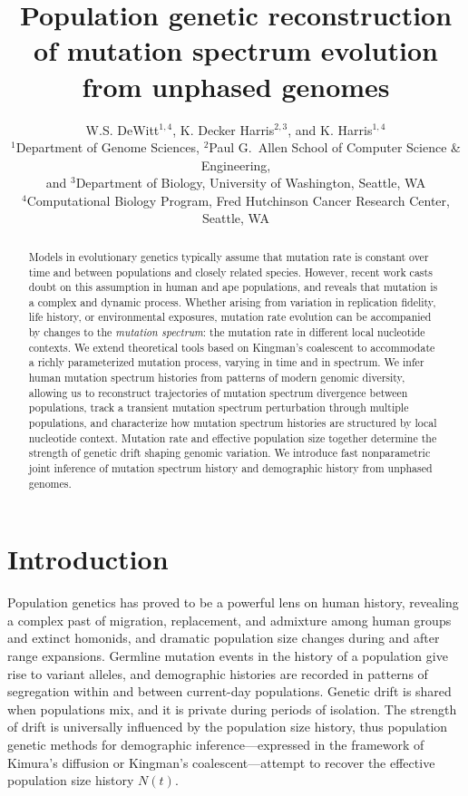 \documentclass[11pt]{article}
\title{Population genetic reconstruction of mutation spectrum evolution from unphased genomes}
\author{
W.S. DeWitt$^{1,4}$, K. Decker Harris$^{2,3}$, and K. Harris$^{1,4}$\\
{\small
$^1$Department of Genome Sciences,
$^2$Paul G.\ Allen School of Computer Science \& Engineering,}\\
{\small and $^3$Department of Biology, University of Washington, Seattle, WA}\\
{\small $^4$Computational Biology Program, Fred Hutchinson Cancer Research Center, Seattle, WA}
}
\begin{document}
\maketitle

\begin{abstract}

Models in evolutionary genetics typically assume that mutation rate is constant over time and between populations and closely related species.
However, recent work casts doubt on this assumption in human and ape populations, and reveals that mutation is a complex and dynamic process.
Whether arising from variation in replication fidelity, life history, or environmental exposures, mutation rate evolution can be accompanied by changes to the \emph{mutation spectrum}: the mutation rate in different local nucleotide contexts.
We extend theoretical tools based on Kingman's coalescent to accommodate a richly parameterized mutation process, varying in time and in spectrum.
We infer human mutation spectrum histories from patterns of modern genomic diversity, allowing us to reconstruct trajectories of mutation spectrum divergence between populations, track a transient mutation spectrum perturbation through multiple populations, and characterize how mutation spectrum histories are structured by local nucleotide context.
Mutation rate and effective population size together determine the strength of genetic drift shaping genomic variation.
We introduce fast nonparametric joint inference of mutation spectrum history and demographic history from unphased genomes.

\end{abstract}


\section*{Introduction}\label{sec:intro}

Population genetics has proved to be a powerful lens on human history\cite{Harris2017-cd}, revealing a complex past of migration\cite{?}, replacement\cite{?}, and admixture among human groups and extinct homonids\cite{?}, and dramatic population size changes during and after range expansions\cite{?}.
Germline mutation events in the history of a population give rise to variant alleles, and demographic histories are recorded in patterns of segregation within and between current-day populations.
Genetic drift is shared when populations mix, and it is private during periods of isolation.
The strength of drift is universally influenced by the population size history, thus population genetic methods for demographic inference---expressed in the framework of Kimura's diffusion or Kingman's coalescent---attempt to recover the effective population size history $N(t)$.
\end{document}

